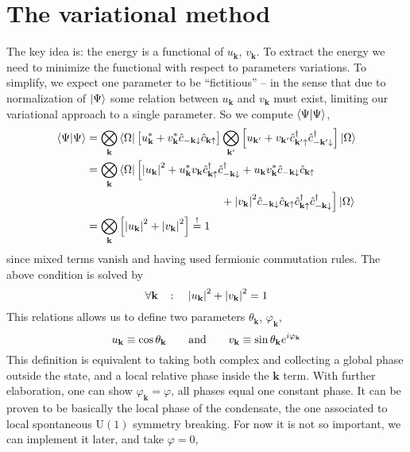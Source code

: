 \section{The variational method}\label{sec:the variational method}

The key idea is: the energy is a functional of $u_\mathbf{k}$, $v_\mathbf{k}$. To extract the energy we need to minimize the functional with respect to parameters variations. To simplify, we expect one parameter to be ``fictitious'' -- in the sense that due to normalization of $\ket{\Psi}$ some relation between $u_\mathbf{k}$ and $v_\mathbf{k}$ must exist, limiting our variational approach to a single parameter. So we compute $\braket{\Psi}{\Psi}$,
\[
\begin{aligned}
	\braket{\Psi}{\Psi} &= \bigotimes_\mathbf{k} \bra{\Omega} \lrS{
		\vphantom{c^\dagger}
		u_\mathbf{k}^* + v_\mathbf{k}^* \hat{c}_{-\mathbf{k}\downarrow} \hat{c}_{\mathbf{k}\uparrow}
	} \bigotimes_{\mathbf{k}'} \lrS{
		u_{\mathbf{k}'} + v_{\mathbf{k}'} \hat{c}_{\mathbf{k}'\uparrow}^\dagger \hat{c}_{-\mathbf{k}'\downarrow}^\dagger
	} \ket{\Omega} \\
	&= \bigotimes_\mathbf{k} \bra{\Omega} \Big[
		\abs{u_\mathbf{k}}^2 + u_\mathbf{k}^* v_\mathbf{k} \hat{c}_{\mathbf{k}\uparrow}^\dagger \hat{c}_{-\mathbf{k}\downarrow}^\dagger + u_\mathbf{k} v_\mathbf{k}^* \hat{c}_{-\mathbf{k}\downarrow} \hat{c}_{\mathbf{k}\uparrow} \\
	&\hspace{12.12em} + \abs{v_\mathbf{k}}^2 \hat{c}_{-\mathbf{k}\downarrow} \hat{c}_{\mathbf{k}\uparrow} \hat{c}_{\mathbf{k}\uparrow}^\dagger \hat{c}_{-\mathbf{k}\downarrow}^\dagger
	\Big] \ket{\Omega} \\
	&= \bigotimes_\mathbf{k} \lrS{
		\vphantom{c^\dagger}
		\abs{u_\mathbf{k}}^2 + \abs{v_\mathbf{k}}^2
	} \imp 1
\end{aligned}
\]
since mixed terms vanish and having used fermionic commutation rules. The above condition is solved by
\[
	\forall\mathbf{k}
	\quad\colon\quad
	\abs{u_\mathbf{k}}^2 + \abs{v_\mathbf{k}}^2 = 1
\]
This relations allows us to define two parameters $\theta_\mathbf{k}$, $\varphi_\mathbf{k}$,
\[
	u_\mathbf{k} \equiv \cos\theta_\mathbf{k}
	\quad\qq{and}\quad
	v_\mathbf{k} \equiv \sin\theta_\mathbf{k} e^{i\varphi_\mathbf{k}}
\]
This definition is equivalent to taking both complex and collecting a global phase outside the state, and a local relative phase inside the $\mathbf{k}$ term. With further elaboration, one can show $\varphi_\mathbf{k} = \varphi$, all phases equal one constant phase. It can be proven to be basically the local phase of the condensate, the one associated to local spontaneous $\mathrm{U}(1)$ symmetry breaking. For now it is not so important, we can implement it later, and take $\varphi=0$,
